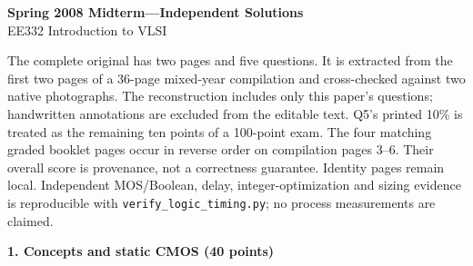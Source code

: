 \documentclass[10pt]{article}
\newcommand{\qheading}[1]{\par\medskip\textbf{#1}\par}
\begin{document}
\begin{center}{\Large\bfseries Spring 2008 Midterm---Independent Solutions}\\EE332 Introduction to VLSI\end{center}
The complete original has two pages and five questions. It is extracted from the first two pages of a 36-page mixed-year compilation and cross-checked against two native photographs. The reconstruction includes only this paper's questions; handwritten annotations are excluded from the editable text. Q5's printed 10\% is treated as the remaining ten points of a 100-point exam.
The four matching graded booklet pages occur in reverse order on compilation pages 3--6. Their overall score is provenance, not a correctness guarantee. Identity pages remain local. Independent MOS/Boolean, delay, integer-optimization and sizing evidence is reproducible with \texttt{verify\_logic\_timing.py}; no process measurements are claimed.
\qheading{1. Concepts and static CMOS (40 points)}
\end{document}
